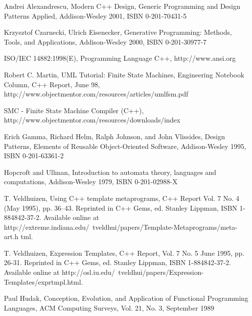 \documentclass{kapproc}
\begin{document}
\begin{chapthebibliography}{1}
Andrei Alexandrescu, Modern C++ Design, Generic Programming and
Design Patterns Applied, Addison-Wesley 2001, ISBN 0-201-70431-5  

Krzysztof Czarnecki, Ulrich Eisenecker, Generative Programming:
Methods, Tools, and Applications, Addison-Wesley 2000, ISBN
0-201-30977-7 

ISO/IEC 14882:1998(E), Programming Language C++, http://www.ansi.org

Robert C. Martin, UML Tutorial: Finite State Machines, Engineering
Notebook Column, C++ Report, June 98,
http://www.objectmentor.com/resources/articles/umlfsm.pdf  

SMC - Finite State Machine Compiler (C++),
http://www.objectmentor.com/resources/downloads/index  

Erich Gamma, Richard Helm, Ralph Johnson, and John Vlissides,
Design Patterns, Elements of Reusable Object-Oriented Software,
Addison-Wesley 1995, ISBN 0-201-63361-2  

Hopcroft and Ullman, Introduction to automata theory, languages and
computations, Addison-Wesley 1979, ISBN 0-201-02988-X  

T. Veldhuizen, Using C++ template metaprograms, C++ Report Vol. 7
No. 4 (May 1995), pp. 36--43. Reprinted in C++ Gems, ed. Stanley Lippman,
ISBN 1-884842-37-2. Available online at
http://extreme.indiana.edu/~tveldhui/papers/Template-Metaprograms/meta-art.h
tml. 

T. Veldhuizen, Expression Templates, C++ Report, Vol. 7 No. 5 June
1995, pp. 26-31. Reprinted in C++ Gems, ed. Stanley Lippman, ISBN
1-884842-37-2. Available online at
http://osl.iu.edu/~tveldhui/papers/Expression-Templates/exprtmpl.html.  

Paul Hudak, Conception, Evolution, and Application of Functional
Programming Languages, ACM Computing Surveys, Vol. 21, No. 3,
September 1989
\end{chapthebibliography}
\end{document}
